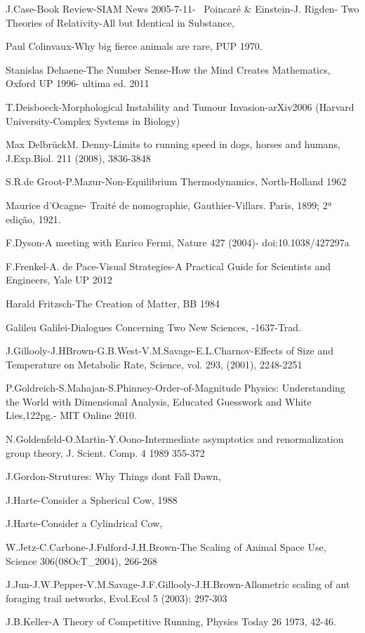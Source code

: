 J.Case-Book Review-SIAM News 2005-7-11- ~Poincaré \& Einstein-J. Rigden- Two Theories of Relativity-All but Identical in Substance,

Paul Colinvaux-Why big fierce animals are rare, PUP 1970.

Stanislas Dehaene-The Number Sense-How the Mind Creates Mathematics, Oxford UP 1996- ultima ed. 2011

T.Deisboeck-Morphological Instability and Tumour Invasion-arXiv2006 (Harvard University-Complex Systems in Biology)

Max DelbrückM. Denny-Limits to running speed in dogs, horses and humans, J.Exp.Biol. 211 (2008), 3836-3848

S.R.de Groot-P.Mazur-Non-Equilibrium Thermodynamics, North-Holland 1962

Maurice d’Ocagne- Traité de nomographie, Gauthier-Villars. Paris, 1899; 2ª edição, 1921.

F.Dyson-A meeting with Enrico Fermi, Nature 427 (2004)- doi:10.1038/427297a

F.Frenkel-A. de Pace-Visual Strategies-A Practical Guide for Scientists and Engineers, Yale UP 2012

Harald Fritzsch-The Creation of Matter, BB 1984

Galileu Galilei-Dialogues Concerning Two New Sciences, -1637-Trad.

J.Gillooly-J.HBrown-G.B.West-V.M.Savage-E.L.Charnov-Effects of Size and Temperature on Metabolic Rate, Science, vol. 293, (2001), 2248-2251

P.Goldreich-S.Mahajan-S.Phinney-Order-of-Magnitude Physics: Understanding the World with Dimensional Analysis, Educated Guesswork and White Lies,122pg.- MIT Online 2010.

N.Goldenfeld-O.Martin-Y.Oono-Intermediate asymptotics and renormalization group theory, J. Scient. Comp. 4 1989 355-372

J.Gordon-Strutures: Why Things dont Fall Dawn,

J.Harte-Consider a Spherical Cow, 1988

J.Harte-Consider a Cylindrical Cow,

W.Jetz-C.Carbone-J.Fulford-J.H.Brown-The Scaling of Animal Space Use, Science 306(08OcT\_{2}004), 266-268

J.Jun-J.W.Pepper-V.M.Savage-J.F.Gillooly-J.H.Brown-Allometric scaling of ant foraging trail networks, Evol.Ecol 5 (2003): 297-303

J.B.Keller-A Theory of Competitive Running, Physics Today 26 1973, 42-46.

